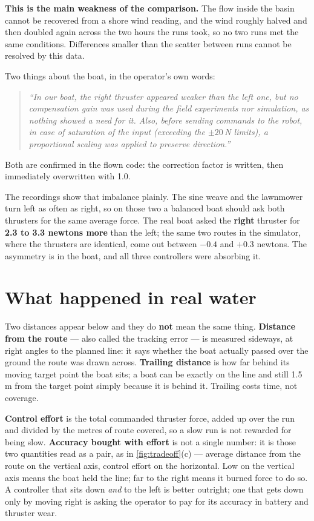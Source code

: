 \documentclass[11pt]{article}
\newcommand{\opquote}[1]{%
  \begin{quote}\itshape\small #1\end{quote}%
}
\begin{document}
\textbf{This is the main weakness of the comparison.} The flow inside the basin cannot be
recovered from a shore wind reading, and the wind roughly halved and then doubled again
across the two hours the runs took, so no two runs met the same conditions. Differences
smaller than the scatter between runs cannot be resolved by this data.

Two things about the boat, in the operator's own words:

\opquote{``In our boat, the right thruster appeared weaker than the left one, but no
compensation gain was used during the field experiments nor simulation, as nothing showed a
need for it. Also, before sending commands to the robot, in case of saturation of the input
(exceeding the $\pm20$\,N limits), a proportional scaling was applied to preserve
direction.''}

Both are confirmed in the flown code: the correction factor is written, then immediately
overwritten with 1.0.

The recordings show that imbalance plainly. The sine weave and the lawnmower turn left as
often as right, so on those two a balanced boat should ask both thrusters for the same
average force. The real boat asked the \textbf{right} thruster for \textbf{2.3 to 3.3
newtons more} than the left; the same two routes in the simulator, where the thrusters are
identical, come out between $-0.4$ and $+0.3$ newtons. The asymmetry is in the boat, and all
three controllers were absorbing it.

\section{What happened in real water}
\label{sec:realwater}

Two distances appear below and they do \textbf{not} mean the same thing.
\textbf{Distance from the route} --- also called the tracking error --- is measured
sideways, at right angles to the planned line: it says whether the boat actually passed over
the ground the route was drawn across. \textbf{Trailing distance} is how far behind its
moving target point the boat sits; a boat can be exactly on the line and still 1.5\,m from
the target point simply because it is behind it. Trailing costs time, not coverage.

\textbf{Control effort} is the total commanded thruster force, added up over the run and
divided by the metres of route covered, so a slow run is not rewarded for being slow.
\textbf{Accuracy bought with effort} is not a single number: it is those two quantities read
as a pair, as in \cref{fig:tradeoff}(c) --- average distance from the route on the vertical
axis, control effort on the horizontal. Low on the vertical axis means the boat held the
line; far to the right means it burned force to do so. A controller that sits down
\emph{and} to the left is better outright; one that gets down only by moving right is asking
the operator to pay for its accuracy in battery and thruster wear.
\end{document}
